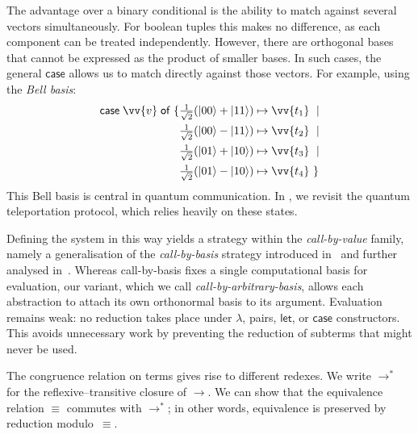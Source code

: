 \documentclass[runningheads,orivec,envcountsame,envcountsect]{llncs}
\providecommand{\qed}{\hbox{\rule{1ex}{1ex}}}%
\newcommand\ket[1]{\ensuremath{|#1\rangle}}
\newcommand\lra{\longrightarrow}
\def\lraneq{\rightsquigarrow}
\def\eval{\lra^*}
\begin{document}
The advantage over a binary conditional is the ability to match against several
vectors simultaneously. For boolean tuples this makes no difference, as each
component can be treated independently. However, there are orthogonal bases
that cannot be expressed as the product of smaller bases. In such cases, the
general $\mathsf{case}$ allows us to match directly against those vectors. For
example, using the \emph{Bell basis}:
\begin{align*}
  \mathsf{case}\;\vv{v}\;\mathsf{of}\;\{&
  \tfrac{1}{\sqrt{2}}(\ket{00}+\ket{11}) \mapsto \vv{t_1}\ \mid\\
  &\tfrac{1}{\sqrt{2}}(\ket{00}-\ket{11}) \mapsto \vv{t_2}\ \mid\\
  &\tfrac{1}{\sqrt{2}}(\ket{01}+\ket{10}) \mapsto \vv{t_3}\ \mid\\
  &\tfrac{1}{\sqrt{2}}(\ket{01}-\ket{10}) \mapsto \vv{t_4}\ \}
\end{align*}
This Bell basis is central in quantum communication. In
, we revisit the quantum teleportation protocol,
which relies heavily on these states.

Defining the system in this way yields a strategy within the
\emph{call-by-value} family, namely a generalisation of the
\emph{call-by-basis} strategy introduced in~\cite{ArrighiDowekLMCS17} and
further analysed in~\cite{AssafDiazcaroPerdrixTassonValironLMCS14}. Whereas
call-by-basis fixes a single computational basis for evaluation, our variant,
which we call \emph{call-by-arbitrary-basis}, allows each abstraction to attach
its own orthonormal basis to its argument. Evaluation remains weak: no
reduction takes place under $\lambda$, pairs, $\mathsf{let}$, or
$\mathsf{case}$ constructors. This avoids unnecessary work by preventing the
reduction of subterms that might never be used.

The congruence relation on terms gives rise to different redexes. We write
$\eval$ for the reflexive–transitive closure of $\lra$. We can show that the
equivalence relation $\equiv$ commutes with $\eval$; in other words,
equivalence is preserved by reduction modulo~$\equiv$.

\end{document}
